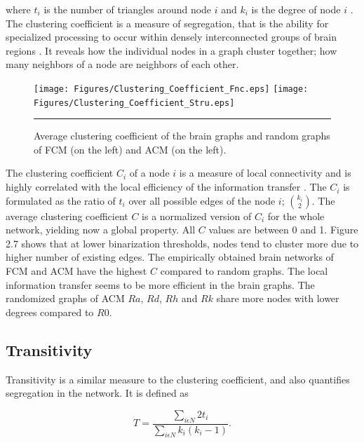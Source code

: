 where $t_i$ is the number of triangles around node $i$ and $k_i$ is the degree of node $i$ \citep{WAT98}. The clustering coefficient is a measure of segregation, that is the ability for specialized processing to occur within densely interconnected groups of brain regions \citep{RUB10}. It reveals how the individual nodes in a graph cluster together; how many neighbors of a node are neighbors of each other. 

\begin{figure}[htbp]
  \centering
	\texttt{[image: Figures/Clustering\_Coefficient\_Fnc.eps]}
	\texttt{[image: Figures/Clustering\_Coefficient\_Stru.eps]} 
    \rule{35em}{0.5pt}
    \caption[Clustering Coefficient]{Average clustering coefficient of the brain graphs and random graphs of FCM (on the left) and ACM (on the left). }
  \label{fig:Clustering Coefficient}
\end{figure}

The clustering coefficient $C_i$ of a node $i$ is a measure of local connectivity and is highly correlated with the local efficiency of the information transfer \citep{LAT01}. The $C_i$ is formulated as the ratio of $t_i$ over all possible edges of the node $i$; $\binom{k_i}{2} $. The average clustering coefficient $C$ is a normalized version of $C_i$ for the whole network, yielding now a global property. All $C$ values are between 0 and 1. Figure 2.7 shows that at lower binarization thresholds, nodes tend to cluster more due to higher number of existing edges. The empirically obtained brain networks of FCM and ACM have the highest $C$ compared to random graphs. The local information transfer seems to be more efficient in the brain graphs.  The randomized graphs of ACM $Ra$, $Rd$, $Rh$ and $Rk$ share more nodes with lower degrees compared to $R0$.

\subsection{Transitivity}

Transitivity is a similar measure to the clustering coefficient, and also quantifies segregation in the network. It is defined as \citep{NEW03}
	
\begin{equation}
 T = \frac{\sum\limits_{i \epsilon N} 2 t_i}{\sum\limits_{i \epsilon N}k_i (k_i - 1)} .
\end{equation}	

